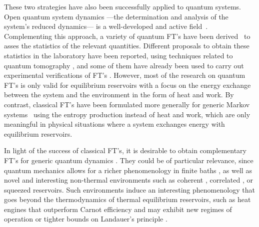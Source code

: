 \documentclass[aps,prx,twocolumn,showpacs,floatfix,superscriptaddress,graphics,longbibliography]{revtex4-1}
\begin{document}
These two strategies  have also been successfully applied to quantum systems.
Open quantum system dynamics  ---the determination and analysis of the system's reduced dynamics--- is a well-developed and active field~\cite{BreuerBook, Rivas}.
Complementing this approach, a variety of quantum FT's have been derived~\cite{CampisiREV,EspositoREV, LutzEP, Gaspard2013, Watanabe:2014fh, Imparato} to asses the statistics of the relevant quantities. 
Different proposals to obtain these statistics in the laboratory have been reported, using techniques related to quantum tomography \cite{Dorner:2013, Mazzola:2013, Campisi:2013, Goold:2013, Roncaglia:2014, Chiara:2015}, 
and some of them have already been used to carry out experimental verifications of FT's \cite{Batalhao:2014ta, An:2015}.
However, most of the research on quantum FT's is only valid for equilibrium reservoirs with a focus on the energy exchange between the system and the environment in the form of heat and work. 
By contrast, classical FT's have been formulated more generally for generic Markov systems~\cite{HatanoSasa,EspositoFaces,EspositoFacesI,EspositoFacesII, Bisker} using the entropy production instead 
of heat and work, which are only meaningful in physical situations where a system exchanges energy with equilibrium reservoirs.

In light of the success of classical FT's, it is desirable to obtain complementary FT's for generic quantum dynamics \cite{Vedral, Kafri2012, Chetrite2012, Albash:2013fq, Rastegin:2014hc, DeffnerPS, JordanParrondo, Funo2013, MHP, Alhambra, Park}.
They could be of particular relevance, since quantum mechanics allows for a richer phenomenology in finite baths \cite{PekolaCalorimeter, Gaspinaretti, Suomela}, as well as novel and interesting non-thermal environments such as 
coherent \cite{Scully, Superradiant}, correlated \cite{LutzCorr}, or squeezed \cite{JaposSqueez,LutzSqueez,CorreaSqz, SqzRes} reservoirs. Such environments induce an interesting phenomenology that goes beyond the 
thermodynamics of thermal equilibrium reservoirs, such as heat engines that outperform Carnot efficiency \cite{Klaers} and may exhibit new regimes of operation \cite{SqzRes, Niedenzu} or tighter bounds on Landauer's principle \cite{ReebWolf,GooldLand}.
\end{document}
